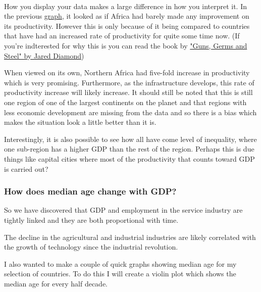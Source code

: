\documentclass[11pt]{article}
\begin{document}
    \begin{center}
    \end{center}
    { \hspace*{\fill} \\}
    
    How you display your data makes a large difference in how you interpret
it. In the previous
\href{https://www.youtube.com/watch?v=sIlNIVXpIns}{graph}, it looked as
if Africa had barely made any improvement on its productivity. However
this is only because of it being compared to countries that have had an
increased rate of productivity for quite some time now. (If you're
indterested for why this is you can read the book by
\href{https://en.wikipedia.org/wiki/Guns,_Germs,_and_Steel}{"Guns, Germs
and Steel" by Jared Diamond})

When viewed on its own, Northern Africa had five-fold increase in
productivity which is very promising. Furthermore, as the infrastructure
develops, this rate of productivity increase will likely increase. It
should still be noted that this is still one region of one of the
largest continents on the planet and that regions with less economic
development are missing from the data and so there is a bias which makes
the situation look a little better than it is.

Interestingly, it is also possible to see how all have come level of
inequality, where one sub-region has a higher GDP than the rest of the
region. Perhaps this is due things like capital cities where most of the
productivity that counts toward GDP is carried out?

    \subsubsection{How does median age change with
GDP?}\label{how-does-median-age-change-with-gdp}

    So we have discovered that GDP and employment in the service industry
are tightly linked and they are both proportional with time.

The decline in the agricultural and industrial industries are likely
correlated with the growth of technology since the industrial
revolution.

I also wanted to make a couple of quick graphs showing median age for my
selection of countries. To do this I will create a violin plot which
shows the median age for every half decade.
\end{document}
